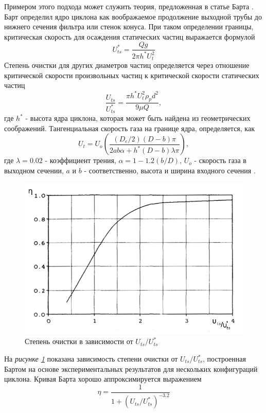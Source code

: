 			Примером этого подхода может служить теория, предложенная в статье Барта \cite{Barth}. Барт определил ядро циклона как воображаемое продолжение выходной трубы до нижнего сечения фильтра или стенок конуса. При таком определении границы, критическая скорость для осаждения статических частиц выражается формулой
			\begin{equation}
				U^{*}_{ts} = \frac{Qg}{2 \pi h^{*} U^2_t}
			\end{equation}
			Степень очистки для других диаметров частиц определяется через отношение критической скорости произвольных частиц к критической скорости статических частиц
			\begin{equation}
				\frac{U_{ts}}{U^{*}_{ts}} = \frac{\pi h^{*}U^2_t\rho_p d^2}{9 \mu Q},
			\end{equation}
			где $h^{*}$ - высота ядра циклона, которая может быть найдена из геометрических соображений. Тангенциальная скорость газа на границе ядра, определяется, как 
			\begin{equation}
				U_t = U_o\left(\frac{(D_e/2)(D-b)\pi}{2ab\alpha + h^{*}(D-b)\lambda \pi}\right),
			\end{equation}
			где $\lambda = 0.02$ - коэффициент трения, $\alpha = 1-1.2(b/D)$, $U_o$ - скорость газа в выходном сечении, $a$ и $b$ - соответственно, высота и ширина входного сечения \cite{Barth}.
			\begin{figure}[ht]
				\centering
				\includegraphics[scale=0.48]{Barth}
				\caption{Степень очистки в зависимости от $U_{ts}/U^{*}_{ts}$}
				\label{fig:barth}
			\end{figure}
			На \textit{рисунке \ref{fig:barth}} показана зависимость степени очистки от $U_{ts}/U^{*}_{ts}$, построенная Бартом на основе экспериментальных результатов для нескольких конфигураций циклона. Кривая Барта хорошо аппроксимируется выражением
			\begin{equation}
				\eta = \frac{1}{1+ (U_{ts}/U^{*}_{ts})^{-3.2}}
			\end{equation}
	

